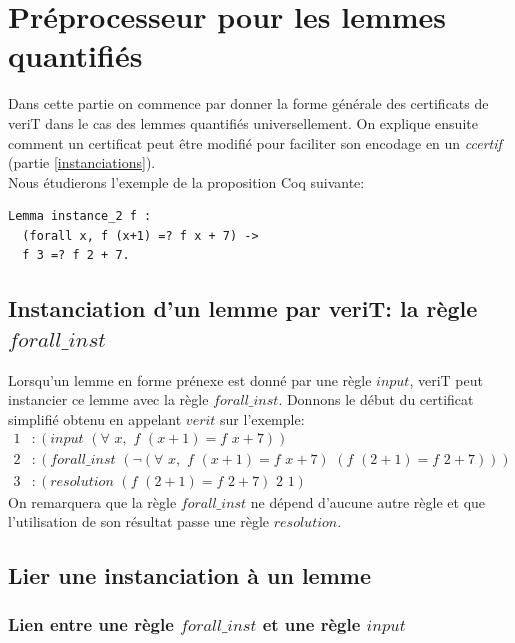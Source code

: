 \documentclass[11pt]{article}
\begin{document}
\section{Préprocesseur pour les lemmes quantifiés}

Dans cette partie on commence par donner la forme générale des certificats de veriT dans le cas des lemmes quantifiés universellement. On explique ensuite comment un certificat peut être modifié pour faciliter son encodage en un \textit{ccertif} (partie \ref{instanciations}). \\

Nous étudierons l'exemple de la proposition Coq suivante: 

\begin{lstlisting}[frame=single]
Lemma instance_2 f : 
  (forall x, f (x+1) =? f x + 7) ->
  f 3 =? f 2 + 7.
\end{lstlisting}


\subsection{Instanciation d'un lemme par veriT: la règle $forall\_inst$}

Lorsqu'un lemme en forme prénexe est donné par une règle $input$, veriT peut instancier ce lemme avec la règle $forall\_inst$. Donnons le début du certificat simplifié obtenu en appelant $verit$ sur l'exemple:
\begin{align*}
1&:(input \,\,(\forall\,\, x,\,\, f\,\, (x+1) = f\,\,x+7)) \\
2&:(forall\_inst \,\,(\neg (\forall\,\, x, \,\,f \,\,(x+1) = f\,\,x+7) \,\,(f \,\,(2+1) = f\,\,2+7)) )\\
3&:(resolution  \,\, (f \,\,(2+1) = f\,\,2+7) \,\,2 \,\,1) 
\end{align*}
On remarquera que la règle $forall\_inst$ ne dépend d'aucune autre règle et que l'utilisation de son résultat passe une règle $resolution$.

\subsection{Lier une instanciation à un lemme} \label{lien}

\subsubsection{Lien entre une règle $forall\_inst$ et une règle $input$} 
\end{document}
